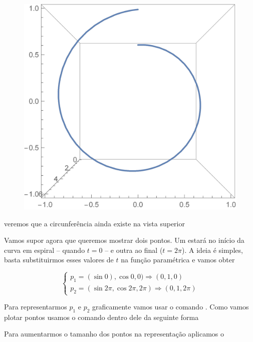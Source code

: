 \documentclass[a4paper, 12pt]{article}
\begin{document}
\newpage
\begin{figure}[!h]
	\centering
	\includegraphics[scale=.5]{images/ParametricPlot3DTopView}
\end{figure}

veremos que a circunferência ainda existe na vista superior

Vamos supor agora que queremos mostrar dois pontos. Um estará no início da curva em espiral -- quando $t=0$ -- e outra ao final ($t=2\pi$). A ideia é simples, basta substituirmos esses valores de $t$ na função paramétrica e vamos obter

$$
\begin{cases}
	p_{1} = (\sin 0),\cos 0,0) \Rightarrow (0,1,0)\\
	p_{2} = (\sin 2\pi,\cos 2\pi, 2\pi) \Rightarrow (0,1,2\pi)
\end{cases}
$$

Para representarmos $p_{1}$ e $p_{2}$ graficamente vamos usar o comando . Como vamos plotar pontos usamos o comando  dentro dele da seguinte forma 

\begin{center}
\end{center}

Para aumentarmos o tamanho dos pontos na representação aplicamos o 
\end{document}
